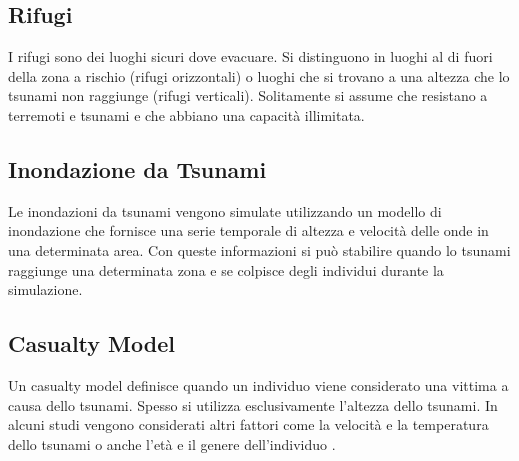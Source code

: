 \subsection{Rifugi}
I rifugi sono dei luoghi sicuri dove evacuare.
Si distinguono in luoghi al di fuori della zona a rischio (rifugi orizzontali) o
luoghi che si trovano a una altezza che lo tsunami non raggiunge (rifugi verticali).
%
Solitamente si assume che resistano a terremoti e tsunami e
che abbiano una capacità illimitata.

\subsection{Inondazione da Tsunami}
Le inondazioni da tsunami vengono simulate utilizzando un modello di inondazione
che fornisce una serie temporale di altezza e velocità delle onde in una determinata area.
Con queste informazioni si può stabilire quando lo tsunami raggiunge una determinata zona e 
se colpisce degli individui durante la simulazione.

\subsection{Casualty Model}
Un casualty model definisce quando un individuo viene considerato una vittima a causa dello tsunami.
Spesso si utilizza esclusivamente l'altezza dello tsunami.
In alcuni studi vengono considerati altri fattori come la velocità
e la temperatura dello tsunami o anche l'età e il genere dell'individuo \parencite{yeh2010gender}.
